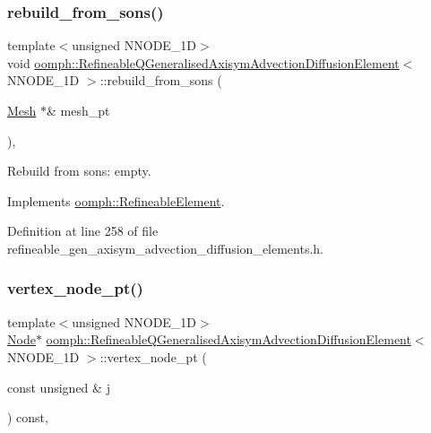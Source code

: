 \subsubsection{\texorpdfstring{rebuild\+\_\+from\+\_\+sons()}{rebuild\_from\_sons()}}
{\footnotesize\ttfamily template$<$unsigned N\+N\+O\+D\+E\+\_\+1D$>$ \\
void \hyperlink{classoomph_1_1RefineableQGeneralisedAxisymAdvectionDiffusionElement}{oomph\+::\+Refineable\+Q\+Generalised\+Axisym\+Advection\+Diffusion\+Element}$<$ N\+N\+O\+D\+E\+\_\+1D $>$\+::rebuild\+\_\+from\+\_\+sons (\begin{DoxyParamCaption}\item[{\hyperlink{classoomph_1_1Mesh}{Mesh} $\ast$\&}]{mesh\+\_\+pt }\end{DoxyParamCaption})\hspace{0.3cm}{\ttfamily [inline]}, {\ttfamily [virtual]}}



Rebuild from sons\+: empty. 



Implements \hyperlink{classoomph_1_1RefineableElement_a33324be27833fa4b78279d17158215fa}{oomph\+::\+Refineable\+Element}.



Definition at line 258 of file refineable\+\_\+gen\+\_\+axisym\+\_\+advection\+\_\+diffusion\+\_\+elements.\+h.

\mbox{\label{classoomph_1_1RefineableQGeneralisedAxisymAdvectionDiffusionElement_a481456d85d19abedca780110a51032e0}} 
\subsubsection{\texorpdfstring{vertex\+\_\+node\+\_\+pt()}{vertex\_node\_pt()}}
{\footnotesize\ttfamily template$<$unsigned N\+N\+O\+D\+E\+\_\+1D$>$ \\
\hyperlink{classoomph_1_1Node}{Node}$\ast$ \hyperlink{classoomph_1_1RefineableQGeneralisedAxisymAdvectionDiffusionElement}{oomph\+::\+Refineable\+Q\+Generalised\+Axisym\+Advection\+Diffusion\+Element}$<$ N\+N\+O\+D\+E\+\_\+1D $>$\+::vertex\+\_\+node\+\_\+pt (\begin{DoxyParamCaption}\item[{const unsigned \&}]{j }\end{DoxyParamCaption}) const\hspace{0.3cm}{\ttfamily [inline]}, {\ttfamily [virtual]}}




